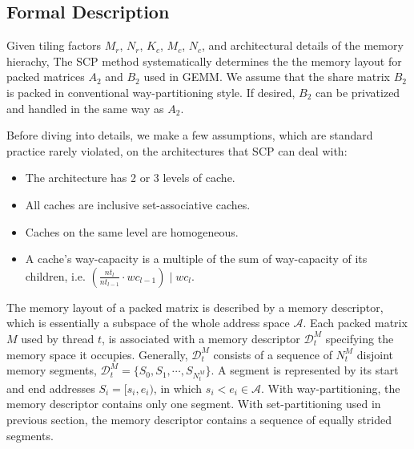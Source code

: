 \subsection{Formal Description}\label{subsec:formal}
Given tiling factors $M_r$, $N_r$, $K_c$, $M_c$, $N_c$,
and architectural details of the memory hierachy,
The SCP method systematically determines the
the memory layout for packed matrices $A_2$ and $B_2$ used in GEMM.
We assume that the share matrix $B_2$ is packed
in conventional way-partitioning style.
If desired, $B_2$ can be privatized and handled in the same way as $A_2$.

Before diving into details, we make a few assumptions,
which are standard practice rarely violated,
on the architectures that SCP can deal with:
\begin{itemize}
\item The architecture has 2 or 3 levels of cache. %
\item All caches are inclusive set-associative caches. %
\item Caches on the same level are homogeneous. %
\item A cache's way-capacity is a multiple of the sum of way-capacity of its children,
i.e. $(\frac{nt_l}{nt_{l-1}} \cdot wc_{l-1}) \mid wc_l$.
\end{itemize}

The memory layout of a packed matrix is described by a memory descriptor,
which is essentially a subspace of the whole address space $\mathcal{A}$.
Each packed matrix $M$ used by thread $t$,
is associated with a memory descriptor $\mathcal{D}_t^M$
specifying the memory space it occupies.
Generally, $\mathcal{D}_t^M$ consists of a sequence of $N_t^M$ disjoint memory segments,
$\mathcal{D}_t^M = \{ S_0, S_1, \cdots, S_{N_t^M}\}$.
A segment is represented by its start and end addresses $S_i = [s_i, e_i)$,
in which $s_i < e_i \in \mathcal{A}$.
With way-partitioning, the memory descriptor contains only one segment.
With set-partitioning used in previous section,
the memory descriptor contains a sequence of equally strided segments.

